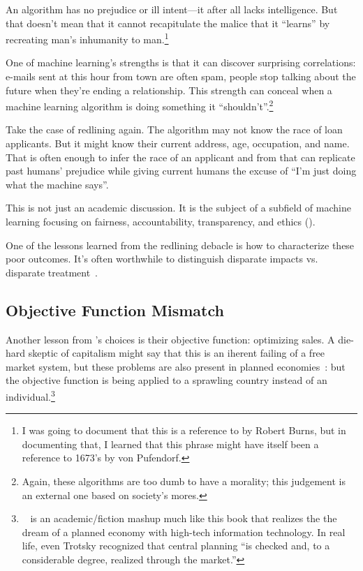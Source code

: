 An algorithm has no prejudice or ill intent---it after all lacks
intelligence.  But that doesn't mean that it cannot recapitulate the
malice that it ``learns'' by recreating man's inhumanity to
man.\footnote{I was going to document that this is a reference to
   by Robert Burns, but in documenting that, I learned
  that this phrase might have itself been a reference to 1673's
   by von
  Pufendorf.}

One of machine learning's strengths is that it can discover surprising
correlations: e-mails sent at this hour from town are often spam,
people stop talking about the future when they're ending a
relationship.  This strength can conceal when a machine learning
algorithm is doing something it ``shouldn't''.\footnote{Again, these
  algorithms are too dumb to have a morality; this judgement is an
  external one based on society's mores.}

Take the case of redlining again.  The algorithm may not know the race
of loan applicants.  But it might know their current address, age,
occupation, and name.  That is often enough to infer the race of an
applicant and from that can replicate past humans' prejudice while
giving current humans the excuse of ``I'm just doing what the machine
says''.

This is not just an academic discussion.  It is the subject of a
subfield of machine learning focusing on fairness, accountability,
transparency, and ethics ().  

One of the lessons learned from the redlining debacle is how to
characterize these poor outcomes.  It's often worthwhile to
distinguish disparate impacts vs. disparate
treatment~\cite{hillier-03}.

\subsection{Objective Function Mismatch}

Another lesson from \energyCompany{}'s choices is their objective
function: optimizing sales.  A die-hard skeptic of capitalism might
say that this is an iherent failing of a free market system, but these
problems are also present in planned economies~\cite{zuaberman-65}:
but the objective function is being applied to a sprawling country
instead of an individual.\footnote{~\cite{spufford-10} is an academic/fiction mashup much like
  this book that realizes the the dream of a planned economy with
  high-tech information technology.  In real life, even Trotsky
  recognized that central planning ``is checked and, to a considerable
  degree, realized through the market.'' }

